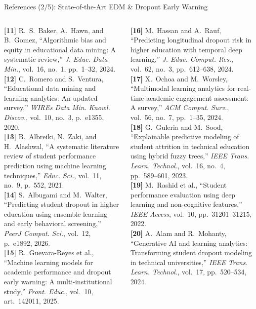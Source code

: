 \documentclass{beamer}
\begin{document}
\begin{frame}[t]{References (2/5): State-of-the-Art EDM \& Dropout Early Warning}
  \begin{columns}[T]
    \fontsize{5.2pt}{6.4pt}\selectfont
    \textbf{[11]} R.~S.~Baker, A.~Hawn, and B.~Gomez, ``Algorithmic bias and equity in educational data mining: A systematic review,'' \textit{J. Educ. Data Min.}, vol.~16, no.~1, pp.~1--32, 2024.\\[4pt]
    \textbf{[12]} C.~Romero and S.~Ventura, ``Educational data mining and learning analytics: An updated survey,'' \textit{WIREs Data Min. Knowl. Discov.}, vol.~10, no.~3, p.~e1355, 2020.\\[4pt]
    \textbf{[13]} B.~Albreiki, N.~Zaki, and H.~Alashwal, ``A systematic literature review of student performance prediction using machine learning techniques,'' \textit{Educ. Sci.}, vol.~11, no.~9, p.~552, 2021.\\[4pt]
    \textbf{[14]} S.~Albugami and M.~Walter, ``Predicting student dropout in higher education using ensemble learning and early behavioral screening,'' \textit{PeerJ Comput. Sci.}, vol.~12, p.~e1892, 2026.\\[4pt]
    \textbf{[15]} R.~Guevara-Reyes et al., ``Machine learning models for academic performance and dropout early warning: A multi-institutional study,'' \textit{Front. Educ.}, vol.~10, art.~142011, 2025.

    \fontsize{5.2pt}{6.4pt}\selectfont
    \textbf{[16]} M.~Hassan and A.~Rauf, ``Predicting longitudinal dropout risk in higher education with temporal deep learning,'' \textit{J. Educ. Comput. Res.}, vol.~62, no.~3, pp.~612--638, 2024.\\[4pt]
    \textbf{[17]} X.~Ochoa and M.~Worsley, ``Multimodal learning analytics for real-time academic engagement assessment: A survey,'' \textit{ACM Comput. Surv.}, vol.~56, no.~7, pp.~1--35, 2024.\\[4pt]
    \textbf{[18]} G.~Guleria and M.~Sood, ``Explainable predictive modeling of student attrition in technical education using hybrid fuzzy trees,'' \textit{IEEE Trans. Learn. Technol.}, vol.~16, no.~4, pp.~589--601, 2023.\\[4pt]
    \textbf{[19]} M.~Rashid et al., ``Student performance evaluation using deep learning and non-cognitive features,'' \textit{IEEE Access}, vol.~10, pp.~31201--31215, 2022.\\[4pt]
    \textbf{[20]} A.~Alam and R.~Mohanty, ``Generative AI and learning analytics: Transforming student dropout modeling in technical universities,'' \textit{IEEE Trans. Learn. Technol.}, vol.~17, pp.~520--534, 2024.
  \end{columns}
\end{frame}
\end{document}

